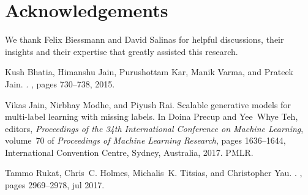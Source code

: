 \documentclass{article}
\begin{document}
\section{Acknowledgements}
We thank Felix Biessmann and David Salinas for helpful discussions, their insights and their expertise that greatly assisted this research. 

\small
% 
% 

\begin{thebibliography}{1}

Kush Bhatia, Himanshu Jain, Purushottam Kar, Manik Varma, and Prateek Jain.
.
,
  pages 730--738, 2015.

Vikas Jain, Nirbhay Modhe, and Piyush Rai.
\newblock Scalable generative models for multi-label learning with missing
  labels.
\newblock In Doina Precup and Yee~Whye Teh, editors, {\em Proceedings of the
  34th International Conference on Machine Learning}, volume~70 of {\em
  Proceedings of Machine Learning Research}, pages 1636--1644, International
  Convention Centre, Sydney, Australia, 2017. PMLR.

Tammo Rukat, Chris~C. Holmes, Michalis~K. Titsias, and Christopher Yau.
.
, pages 2969--2978, jul 2017.

\end{thebibliography}




\end{document}
